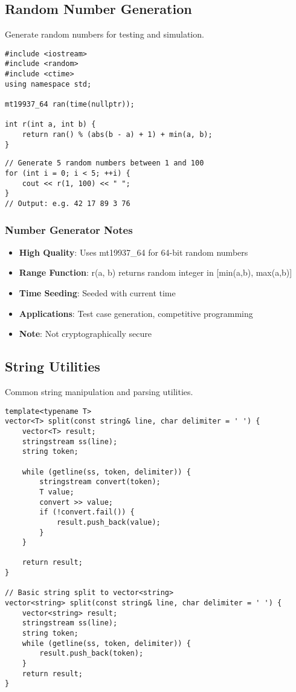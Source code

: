 \documentclass[11pt,a4paper]{article}
\begin{document}
\newpage

\subsection{Random Number Generation}
Generate random numbers for testing and simulation.

\begin{lstlisting}[caption={Random Number Generator}]
#include <iostream>
#include <random>
#include <ctime>
using namespace std;

mt19937_64 ran(time(nullptr));

int r(int a, int b) {
    return ran() % (abs(b - a) + 1) + min(a, b);
}
\end{lstlisting}

\begin{lstlisting}[caption={Random Number Generator Example Usage}]
// Generate 5 random numbers between 1 and 100
for (int i = 0; i < 5; ++i) {
    cout << r(1, 100) << " ";
}
// Output: e.g. 42 17 89 3 76
\end{lstlisting}

\subsubsection*{Number Generator Notes}
\begin{itemize}
\item \textbf{High Quality}: Uses mt19937\_64 for 64-bit random numbers
\item \textbf{Range Function}: r(a, b) returns random integer in [min(a,b), max(a,b)]
\item \textbf{Time Seeding}: Seeded with current time
\item \textbf{Applications}: Test case generation, competitive programming
\item \textbf{Note}: Not cryptographically secure
\end{itemize}

\newpage

\subsection{String Utilities}
Common string manipulation and parsing utilities.

\begin{lstlisting}[caption={String Split Utility}]
template<typename T>
vector<T> split(const string& line, char delimiter = ' ') {
    vector<T> result;
    stringstream ss(line);
    string token;

    while (getline(ss, token, delimiter)) {
        stringstream convert(token);
        T value;
        convert >> value;
        if (!convert.fail()) {
            result.push_back(value);
        }
    }

    return result;
}

// Basic string split to vector<string>
vector<string> split(const string& line, char delimiter = ' ') {
    vector<string> result;
    stringstream ss(line);
    string token;
    while (getline(ss, token, delimiter)) {
        result.push_back(token);
    }
    return result;
}
\end{lstlisting}
\end{document}
